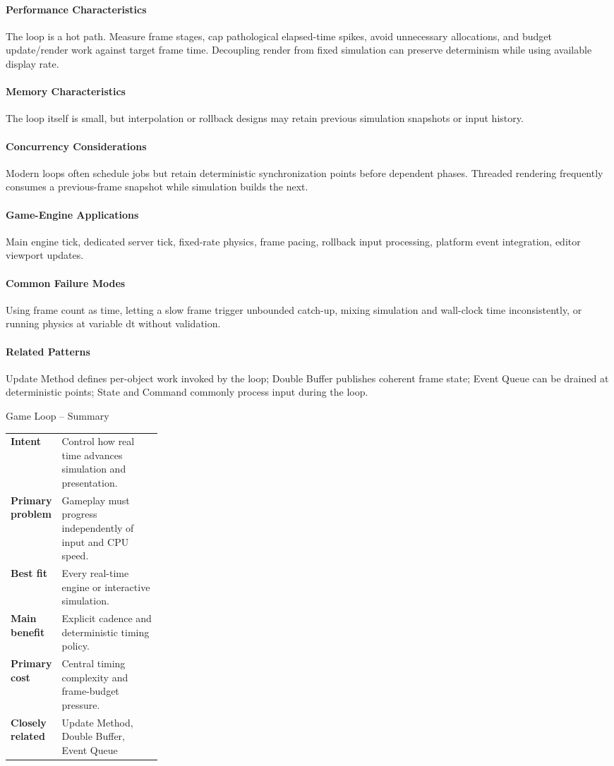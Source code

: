 \documentclass[11pt]{article}
\begin{document}
\paragraph{Performance Characteristics} The loop is a hot path. Measure frame stages, cap pathological elapsed-time spikes, avoid unnecessary allocations, and budget update/render work against target frame time. Decoupling render from fixed simulation can preserve determinism while using available display rate.
\paragraph{Memory Characteristics} The loop itself is small, but interpolation or rollback designs may retain previous simulation snapshots or input history.
\paragraph{Concurrency Considerations} Modern loops often schedule jobs but retain deterministic synchronization points before dependent phases. Threaded rendering frequently consumes a previous-frame snapshot while simulation builds the next.
\paragraph{Game-Engine Applications} Main engine tick, dedicated server tick, fixed-rate physics, frame pacing, rollback input processing, platform event integration, editor viewport updates.
\paragraph{Common Failure Modes} Using frame count as time, letting a slow frame trigger unbounded catch-up, mixing simulation and wall-clock time inconsistently, or running physics at variable dt without validation.
\paragraph{Related Patterns} Update Method defines per-object work invoked by the loop; Double Buffer publishes coherent frame state; Event Queue can be drained at deterministic points; State and Command commonly process input during the loop.

\begin{patternsummary}{Game Loop -- Summary}
\begin{tabularx}{\linewidth}{@{}>{\bfseries}p{0.25\linewidth}X@{}}
Intent & Control how real time advances simulation and presentation. \\
Primary problem & Gameplay must progress independently of input and CPU speed. \\
Best fit & Every real-time engine or interactive simulation. \\
Main benefit & Explicit cadence and deterministic timing policy. \\
Primary cost & Central timing complexity and frame-budget pressure. \\
Closely related & Update Method, Double Buffer, Event Queue \\
\end{tabularx}
\end{patternsummary}
\end{document}
